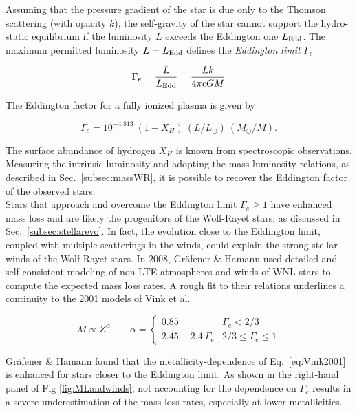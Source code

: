 \documentclass[a4paper,titlepage]{book}     	%
\begin{document}
Assuming that the pressure gradient of the star is due only to the Thomson scattering (with opacity $k$), the self-gravity of the star cannot support the hydro-static equilibrium if the luminosity $L$ exceeds the Eddington one $L_{\rm Edd}$. The maximum permitted luminosity $L=L_{\rm Edd}$ defines the \emph{Eddington limit} $\Gamma_e$

\begin{equation}\label{eq:Eddingtonfactor}
\Gamma_e = \frac{L}{L_\textup{Edd}} = \frac{L k}{4 \pi c G M}
\end{equation}

The Eddington factor for a fully ionized plasma is given by

\begin{equation}\label{eq:EddingtonObserved}
\Gamma_e = 10^{-4.813}~(1+X_H)~(L/L_\odot)~(M_\odot/M).
\end{equation}

The surface abundance of hydrogen $X_H$ is known from spectroscopic observations. Measuring the intrinsic luminosity and adopting the mass-luminosity relations, as described in Sec.\ \ref{subsec:massWR}, it is possible to recover the Eddington factor of the observed stars.\\


Stars that approach and overcome the Eddington limit $\Gamma_e \geq 1$ have enhanced mass loss and are likely the progenitors of the Wolf-Rayet stars, as discussed in Sec.\ \ref{subsec:stellarevo}. In fact, the evolution close to the Eddington limit, coupled with multiple scatterings in the winds, could explain the strong stellar winds of the Wolf-Rayet stars. In 2008, Gr{\"a}fener \& Hamann \cite{G&H_WRmassloss} used detailed and self-consistent modeling of non-LTE atmospheres and winds of WNL stars to compute the expected mass loss rates. A rough fit \cite{parsec2015_chen} to their relations underlines a continuity to the 2001 models of Vink et al.\

\begin{equation}\label{eq:WRwindGH2008}
\dot M \propto Z^{\alpha} \quad \quad  \alpha = 
\begin{cases}
0.85 & \Gamma_e < 2/3 \\
2.45-2.4~\Gamma_e & 2/3 \leq \Gamma_e \leq 1
\end{cases}
\end{equation}

Gr{\"a}fener \& Hamann found that the metallicity-dependence of Eq.\ \ref{eq:Vink2001} is enhanced for stars closer to the Eddington limit. As shown in the right-hand panel of Fig \ref{fig:MLandwinds}, not accounting for the dependence on $\Gamma_e$ results in a severe underestimation of the mass loss rates, especially at lower metallicities.\\
\end{document}
